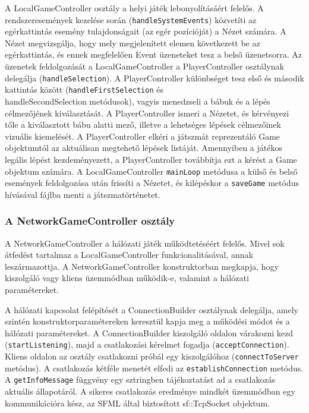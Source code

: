 \documentclass[12pt, twoside]{report}
\begin{document}
A LocalGameController osztály a helyi játék lebonyolításáért felelős. A rendszeresemények kezelése során ({\tt handleSystemEvents}) közvetíti az egérkattintás esemény tulajdonságait (az egér pozícióját) a Nézet számára. A Nézet megvizsgálja, hogy mely megjelenített elemen következett be az egérkattintás, és ennek megfelelően Event üzeneteket tesz a belső üzenetsorra. Az üzenetek feldolgozását a LocalGameController a PlayerController osztálynak delegálja ({\tt handleSelection}). A PlayerController különbséget tesz első és második kattintás között ({\tt handleFirstSelection} és {\\handleSecondSelection} metódusok), vagyis menedzseli a bábuk és a lépés célmezőjének kiválasztását. A PlayerController ismeri a Nézetet, és kérvényezi tőle a kiválasztott bábu alatti mező, illetve a lehetséges lépések célmezőinek vizuális kiemelését. A PlayerController elkéri a játszmát reprezentáló Game objektumtól az aktuálisan megtehető lépések listáját. Amennyiben a játékos legális lépést kezdeményezett, a PlayerController továbbítja ezt a kérést a Game objektum számára. A LocalGameController {\tt mainLoop} metódusa a külső és belső események feldolgozása után frissíti a Nézetet, és kilépéskor a {\tt saveGame} metódus hívásával fájlba menti a játszmatörténetet.

\subsubsection{A NetworkGameController osztály}

A NetworkGameController a hálózati játék működtetéséért felelős. Mivel sok átfedést tartalmaz a LocalGameController funkcionalitásával, annak leszármazottja. A NetworkGameController konstruktorban megkapja, hogy kiszolgáló vagy kliens üzemmódban működik-e, valamint a hálózati paramétereket. 

A hálózati kapcsolat felépítését a ConnectionBuilder osztálynak delegálja, amely szintén konstruktorparamétereken keresztül kapja meg a működési módot és a hálózati paramétereket. A ConnectionBuilder kiszolgáló oldalon várakozni kezd ({\tt startListening}), majd a csatlakozási kérelmet fogadja ({\tt acceptConnection}). Kliens oldalon az osztály csatlakozni próbál egy kiszolgálóhoz ({\tt connectToServer} metódus). A csatlakozás kétféle menetét elfedi az {\tt establishConnection} metódus. A {\tt getInfoMessage} függvény egy sztringben tájékoztatást ad a csatlakozás aktuális állapotáról. A sikeres csatlakozás eredménye mindkét üzemmódban egy kommunikációra kész, az SFML által biztosított sf::TcpSocket objektum.
\end{document}
